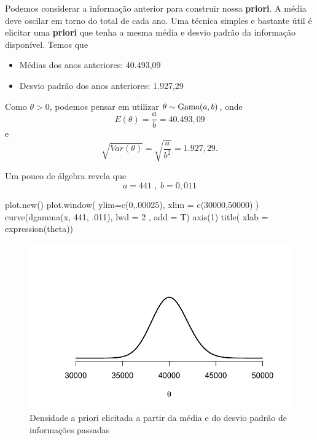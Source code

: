 \documentclass[
  letterpaper,
  DIV=11,
  numbers=noendperiod]{scrreprt}
\newenvironment{Shaded}{\begin{snugshade}}{\end{snugshade}}
\newcommand{\AttributeTok}[1]{\textcolor[rgb]{0.40,0.45,0.13}{#1}}
\newcommand{\DecValTok}[1]{\textcolor[rgb]{0.68,0.00,0.00}{#1}}
\newcommand{\FunctionTok}[1]{\textcolor[rgb]{0.28,0.35,0.67}{#1}}
\newcommand{\NormalTok}[1]{\textcolor[rgb]{0.00,0.23,0.31}{#1}}
\providecommand{\tightlist}{%
  \setlength{\itemsep}{0pt}\setlength{\parskip}{0pt}}\usepackage{longtable,booktabs,array}
\theoremstyle{definition}
\theoremstyle{definition}
\theoremstyle{remark}
\begin{document}
Podemos considerar a informação anterior para construir nossa
\textbf{priori}. A média deve oscilar em torno do total de cada ano. Uma
técnica simples e bastante útil é elicitar uma \textbf{priori} que tenha
a mesma média e desvio padrão da informação disponível. Temos que

\begin{itemize}
\tightlist
\item
  Médias dos anos anteriores: 40.493,09
\item
  Desvio padrão dos anos anteriores: 1.927,29
\end{itemize}

Como \(\theta>0\), podemos pensar em utilizar
\(\theta\sim\hbox{Gama}(a,b)\), onde \[E(\theta)=\frac{a}{b}=40.493,09\]
e \[\sqrt{Var(\theta)}=\sqrt{\frac{a}{b^2}}=1.927,29.\]

Um pouco de álgebra revela que \[a=441\;,\;b=0,011\]

\begin{Shaded}
\begin{Highlighting}[]
\FunctionTok{plot.new}\NormalTok{()}
\FunctionTok{plot.window}\NormalTok{( }\AttributeTok{ylim=}\FunctionTok{c}\NormalTok{(}\DecValTok{0}\NormalTok{,.}\DecValTok{00025}\NormalTok{), }\AttributeTok{xlim =} \FunctionTok{c}\NormalTok{(}\DecValTok{30000}\NormalTok{,}\DecValTok{50000}\NormalTok{) )}
\FunctionTok{curve}\NormalTok{(}\FunctionTok{dgamma}\NormalTok{(x, }\DecValTok{441}\NormalTok{, .}\DecValTok{011}\NormalTok{), }\AttributeTok{lwd =} \DecValTok{2}\NormalTok{ , }\AttributeTok{add =}\NormalTok{ T)}
\FunctionTok{axis}\NormalTok{(}\DecValTok{1}\NormalTok{)}
\FunctionTok{title}\NormalTok{( }\AttributeTok{xlab =} \FunctionTok{expression}\NormalTok{(theta))}
\end{Highlighting}
\end{Shaded}

\begin{figure}[H]

{\centering \includegraphics{intro_files/figure-pdf/fig-gammaElicitada-1.pdf}

}

\caption{\label{fig-gammaElicitada}Densidade a priori elicitada a partir
da média e do desvio padrão de informações passadas}

\end{figure}
\end{document}
